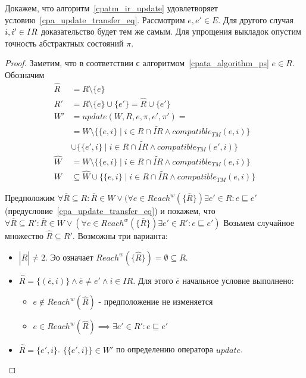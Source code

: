 Докажем, что алгоритм~\ref{cpatm_ir_update} удовлетворяет условию~\ref{cpa_update_transfer_eq}.
Рассмотрим $e,e' \in E$. Для другого случая $i,i' \in IR$ доказательство будет тем же самым. 
Для упрощения выкладок опустим точность абстрактных состояний $\pi$.

\begin{proof}

Заметим, что в соответствии с алгоритмом~\ref{cpata_algorithm_ps} $e \in R$. Обозначим
\begin{align}
\widehat{R} & = R \setminus \{e\} \nonumber \\
R' & = R \setminus \{e\} \cup \{e'\} = \widehat{R} \cup \{e'\} \nonumber \\
W' & = update(W, R, e, \pi, e', \pi') = \nonumber \\
& = W \setminus \{\{e, i\} \mid i \in R \cap \tilde{IR} \land compatible_{TM}(e, i)\} \nonumber \\
& \cup \{\{e', i\} \mid i \in R \cap \tilde{IR} \land compatible_{TM}(e', i)\}  \nonumber \\
\hat{W} & = W \setminus \{\{e, i\} \mid i \in R \cap \tilde{IR} \land compatible_{TM}(e, i)\} \nonumber \\
W & \subseteq \hat{W} \cup \{\{e, i\} \mid i \in R \cap \tilde{IR} \land compatible_{TM}(e, i)\} \nonumber
\end{align}

Предположим
$\forall \overline{R} \subseteq R: \overline{R} \in W \lor (\forall e \in Reach^w(\{\overline{R}\}) \exists e' \in R: e \sqsubseteq e'$ 
(предусловие~\ref{cpa_update_transfer_eq}) и покажем, что
$\forall \overline{R} \subseteq R': \overline{R} \in W \lor (\forall e \in Reach^w(\{\overline{R}\}) \exists e' \in R': e \sqsubseteq e')$
Возьмем случайное множество $\widehat{R} \subseteq R'$. Возможны три варианта:

\begin{itemize}
\item $|\widehat{R}| \neq 2$. Эо означает $Reach^w(\{\widehat{R}\}) = \emptyset \subseteq R$.
\item $\widehat{R} = \{(\overline{e}, i)\} \land \overline{e} \neq e' \land i \in IR$. Для этого $\overline{e}$ начальное условие выполнено:
\begin{itemize}
\item $e \notin Reach^w(\widehat{R})$ - предположение не изменяется
\item $e \in Reach^w(\widehat{R}) \implies \exists e' \in R': e \sqsubseteq e'$ 
\end{itemize}
\item $\widehat{R} = \{e', i\}$. $\{\{e', i\}\} \in W'$ по определению оператора $update$.
\end{itemize}

\end{proof}

